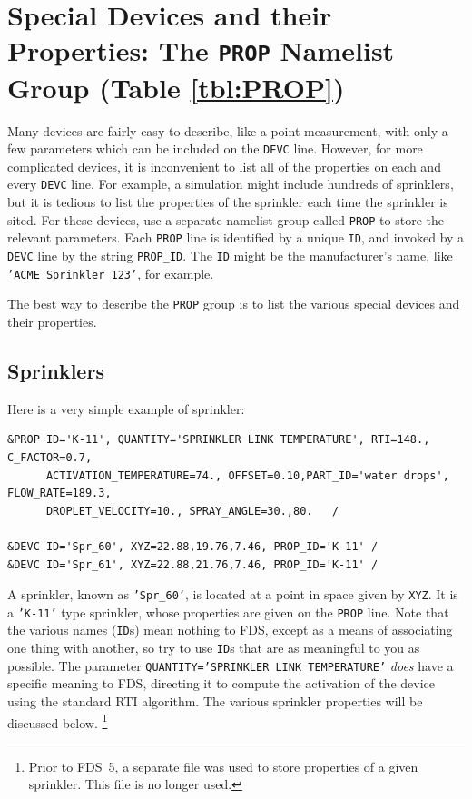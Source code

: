 \documentclass[11pt]{book}
\newcommand{\ct}{\tt\small}
\begin{document}
\newpage

\section{Special Devices and their Properties: The \texorpdfstring{{\tt PROP}}{PROP} Namelist Group (Table \ref{tbl:PROP})}
\label{info:PROP}

Many devices are fairly easy to describe, like a point measurement, with only a few parameters which can be included on the
{\ct DEVC} line. However, for more complicated devices, it is inconvenient to list all of the properties on each and every
{\ct DEVC} line. For example, a simulation might include hundreds of sprinklers, but it is tedious to list the properties of the
sprinkler each time the sprinkler is sited. For these devices, use a separate namelist group called {\ct PROP} to store the relevant parameters.
Each {\ct PROP} line is identified by a unique {\ct ID}, and invoked by a {\ct DEVC} line by the string {\ct PROP\_ID}.
The {\ct ID} might be the manufacturer's
name, like {\ct 'ACME Sprinkler 123'}, for example.

The best way to describe the {\ct PROP} group is to list the various special devices and their properties.


\subsection{Sprinklers}
\label{info:sprinklers}

Here is a very simple example of sprinkler:

\footnotesize
\begin{verbatim}
&PROP ID='K-11', QUANTITY='SPRINKLER LINK TEMPERATURE', RTI=148., C_FACTOR=0.7,
      ACTIVATION_TEMPERATURE=74., OFFSET=0.10,PART_ID='water drops', FLOW_RATE=189.3,
      DROPLET_VELOCITY=10., SPRAY_ANGLE=30.,80.   /

&DEVC ID='Spr_60', XYZ=22.88,19.76,7.46, PROP_ID='K-11' /
&DEVC ID='Spr_61', XYZ=22.88,21.76,7.46, PROP_ID='K-11' /
\end{verbatim} \normalsize

\noindent
A sprinkler, known as {\ct 'Spr\_60'}, is located at a point in space given by {\ct XYZ}. It is a {\ct 'K-11'} type sprinkler, whose properties
are given on the {\ct PROP} line. Note that the various names ({\ct ID}s) mean nothing to FDS, except as a means of associating one thing with
another, so try to use {\ct ID}s that are as meaningful to you as possible.  The parameter {\ct QUANTITY='SPRINKLER LINK TEMPERATURE'} {\em does}
have a specific meaning to FDS, directing it to compute the activation of
the device using the standard RTI algorithm. The various sprinkler properties will be discussed below.
\footnote{Prior to FDS~5, a separate file was used to store
properties of a given sprinkler. This file is no longer used.}
\end{document}
